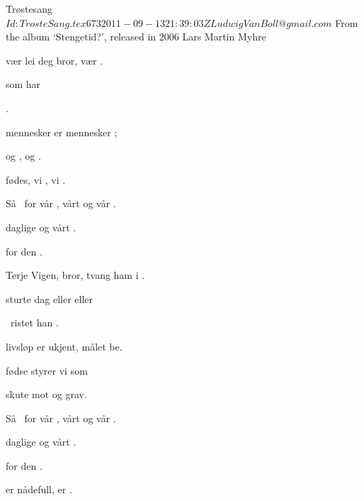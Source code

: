 \begin{SBSong}{Tr\o stesang}
  {$Id: TrosteSang.tex 673 2011-09-13 21:39:03Z LudwigVanBoll@gmail.com $}
  {From the album `Stengetid?', released in 2006}
  {Lars Martin Myhre}
  \begin{SBVerse}
	 v\ae r lei deg bror,  v\ae r . 

	  som  har 

	  .
	
	 mennesker er  mennesker ; 

	 og ,  og .

	 f\o des, vi , vi .
  \end{SBVerse}
  \begin{SBChorus}
	S\aa\  for v\aa r , v\aa rt  og v\aa r . 
	
	 daglige  og v\aa rt  . 
	
	 for den  .
  \end{SBChorus}
  \begin{SBVerse}
	 Terje Vigen, bror,  tvang ham i . 
	
	 sturte  dag eller  eller  
	
	\ ristet han  .

	 livsl\o p er ukjent,  m\aa let be. 
	
	 f\o dse styrer vi  som  
	
	 skute mot  og  grav.
  \end{SBVerse}
  \begin{SBChorus}
	S\aa\  for v\aa r , v\aa rt  og v\aa r . 
	
	 daglige  og v\aa rt  . 
	
	 for den  .
  \end{SBChorus}
  \CBPageBrk
  \begin{SBVerse}
	 er n\aa defull,  er .


\end{SBVerse}
\end{SBSong}
